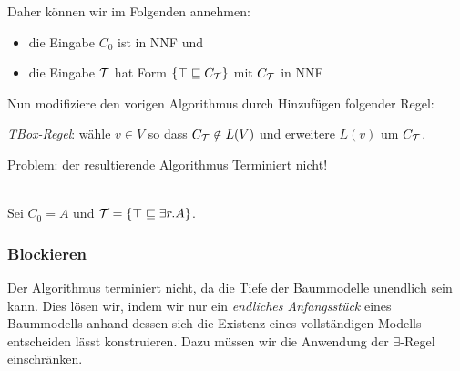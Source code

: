 Daher können wir im Folgenden annehmen:

\begin{itemize}
	\item die Eingabe $C_0$ ist in NNF und
	\item die Eingabe $\mathcal{T}$ hat Form $\{\top \sqsubseteq C_{\mathcal{T}}\}$ mit $C_{\mathcal{T}}$ in NNF
\end{itemize}

Nun modifiziere den vorigen Algorithmus durch Hinzufügen folgender Regel:

\begin{center}
\emph{TBox-Regel}: wähle $v \in V$ so dass $C_{\MT} \notin L\left( V \right)$ und
erweitere $L\left( v \right)$ um $C_{\mathcal{T}}$.
\end{center}

Problem: der resultierende Algorithmus Terminiert nicht!

\begin{tafel}\mbox{}\\
    Sei $C_0 = A$ und $\mathcal{T} = \{\top \sqsubseteq \exists r.A\}$.

    \begin{center}
    \end{center}
\end{tafel}

\subsubsection{Blockieren}\label{blockieren}

Der Algorithmus terminiert nicht, da die Tiefe der Baummodelle unendlich sein kann. Dies lösen wir, indem wir nur ein \emph{endliches Anfangsstück} eines Baummodells anhand dessen sich die Existenz eines vollständigen Modells entscheiden lässt konstruieren. Dazu müssen wir die Anwendung der $\exists$-Regel einschränken.

